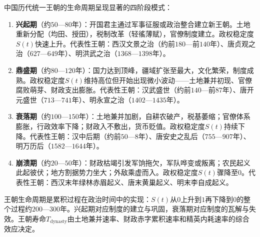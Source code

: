 \begin{definition}[王朝生命周期的四阶段模型]\label{def:dynasty_lifecycle}
中国历代统一王朝的生命周期呈现显著的四阶段模式：
\begin{enumerate}[label=(\roman*)]
    \item \textbf{兴起期}（约$50$—$80$年）：开国君主通过军事征服或政治整合建立新王朝。土地重新分配（均田、授田），税制改革（轻徭薄赋），官僚制度建立。政权稳定度$S(t)$快速上升。代表性王朝：西汉文景之治（约前$180$—前$140$年）、唐贞观之治（$627$—$649$年）、明洪武之治（$1368$—$1398$年）。
    \item \textbf{鼎盛期}（约$80$—$120$年）：国力达到顶峰，疆域扩张至最大，文化繁荣，制度成熟。政权稳定度$S(t)$维持高位但开始出现微小波动——土地兼并初现、官僚腐败萌芽、财政支出膨胀。代表性王朝：汉武盛世（约前$140$—前$87$年）、唐开元盛世（$713$—$741$年）、明永宣之治（$1402$—$1435$年）。
    \item \textbf{衰落期}（约$100$—$150$年）：土地兼并加剧，自耕农破产，税基萎缩；官僚体系膨胀，行政效率下降；财政入不敷出，货币贬值。政权稳定度$S(t)$持续下降。代表性王朝：汉中后期（约前$50$—$8$年）、唐安史之乱后（$755$—$907$年）、明万历后（$1582$—$1644$年）。
    \item \textbf{崩溃期}（约$20$—$50$年）：财政枯竭引发军饷拖欠，军队哗变或叛离；农民起义此起彼伏；地方割据势力坐大；外敌乘虚而入。政权稳定度$S(t)$骤降至$0$。代表性王朝：西汉末年绿林赤眉起义、唐末黄巢起义、明末李自成起义。
\end{enumerate}
王朝生命周期是累积过程在政治时间中的实现：$S(t)$从$0$上升到$1$再下降到$0$的整个过程约$200$—$300$年。兴起期对应制度的建立与巩固，衰落期对应制度的瓦解与失效。王朝寿命$T_{\text{dynasty}}$由土地兼并速率、财政赤字累积速率和精英内耗速率的综合效应决定。
\end{definition}

